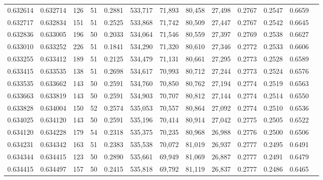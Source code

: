 \begin{tabular}{rrrrrrrrrrrrr}
0.632614 & 0.632714 &   126 &  51 &                                     0.2881 & 533,717 &  71,893 &  80,458 &  27,498 & 0.2767 & 0.2547 & 0.6659 \\
0.632717 & 0.632834 &   151 &  51 &                                     0.2525 & 533,868 &  71,742 &  80,509 &  27,447 & 0.2767 & 0.2542 & 0.6645 \\
0.632836 & 0.633005 &   196 &  50 &                                     0.2033 & 534,064 &  71,546 &  80,559 &  27,397 & 0.2769 & 0.2538 & 0.6627 \\
0.633010 & 0.633252 &   226 &  51 &                                     0.1841 & 534,290 &  71,320 &  80,610 &  27,346 & 0.2772 & 0.2533 & 0.6606 \\
0.633255 & 0.633412 &   189 &  51 &                                     0.2125 & 534,479 &  71,131 &  80,661 &  27,295 & 0.2773 & 0.2528 & 0.6589 \\
0.633415 & 0.633535 &   138 &  51 &                                     0.2698 & 534,617 &  70,993 &  80,712 &  27,244 & 0.2773 & 0.2524 & 0.6576 \\
0.633535 & 0.633662 &   143 &  50 &                                     0.2591 & 534,760 &  70,850 &  80,762 &  27,194 & 0.2774 & 0.2519 & 0.6563 \\
0.633663 & 0.633819 &   143 &  50 &                                     0.2591 & 534,903 &  70,707 &  80,812 &  27,144 & 0.2774 & 0.2514 & 0.6550 \\
0.633828 & 0.634004 &   150 &  52 &                                     0.2574 & 535,053 &  70,557 &  80,864 &  27,092 & 0.2774 & 0.2510 & 0.6536 \\
0.634025 & 0.634120 &   143 &  50 &                                     0.2591 & 535,196 &  70,414 &  80,914 &  27,042 & 0.2775 & 0.2505 & 0.6522 \\
0.634120 & 0.634228 &   179 &  54 &                                     0.2318 & 535,375 &  70,235 &  80,968 &  26,988 & 0.2776 & 0.2500 & 0.6506 \\
0.634231 & 0.634342 &   163 &  51 &                                     0.2383 & 535,538 &  70,072 &  81,019 &  26,937 & 0.2777 & 0.2495 & 0.6491 \\
0.634344 & 0.634415 &   123 &  50 &                                     0.2890 & 535,661 &  69,949 &  81,069 &  26,887 & 0.2777 & 0.2491 & 0.6479 \\
0.634415 & 0.634497 &   157 &  50 &                                     0.2415 & 535,818 &  69,792 &  81,119 &  26,837 & 0.2777 & 0.2486 & 0.6465 \\

\end{tabular}
